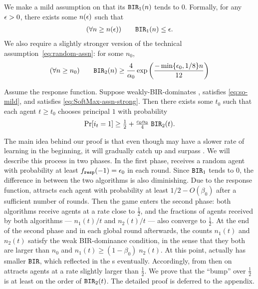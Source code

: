  We make a mild assumption on \alg[1] that its $\mathtt{BIR}_1(n)$ tends to
 0. Formally, for any $\epsilon > 0$, there exists some $n(\epsilon)$ such
 that
 \begin{align}\label{eq:so-mild}
   (\forall n\geq n(\epsilon)) \qquad \mathtt{BIR}_1(n) \leq \epsilon.
 \end{align}
 We also require a slightly stronger version of the technical
 assumption~\eqref{eq:random-assn}:%
for some $n_0$,
\begin{align}\label{eq:SoftMax-assn-strong}
(\forall n\geq n_0) \qquad 
\mathtt{BIR}_2(n) \geq \frac{4}{\alpha_0} \exp \left( \frac{-\min\{\epsilon_0, 1/8\} n}{12}\right)
\end{align}




\begin{theorem}\label{thm:SoftMax-strong}
  Assume the \SoftMaxRandom response function. Suppose \alg[1]
  weakly-BIR-dominates \alg[2], \alg[1] satisfies \eqref{eq:so-mild},
  and \alg[2] satisfies \eqref{eq:SoftMax-assn-strong}. Then there
  exists some $t_0$ such that each agent $t\geq t_0$ chooses principal
  $1$ with probability
\begin{align}\label{eq:thm:SoftMax-strong}
     \Pr[i_t = 1]\geq \tfrac12 +  \tfrac{c_0\alpha_0}{4}\; \mathtt{BIR}_2(t).
\end{align}
\end{theorem}




The main idea behind our proof is that even though \alg[1] may have a slower rate of learning in the beginning, it will gradually catch up
and surpass \alg[2]. We will describe this process in two phases. In
the first phase, \alg[1] receives a random agent with probability at
least $f_{\mathtt{resp}}(-1) = \epsilon_0$ in each round. Since $\mathtt{BIR}_1$ tends to 0,
the difference in  between the two algorithms is also
diminishing. Due to the \SoftMaxRandom response function, \alg[1]
attracts each agent with probability at least $1/2 - O(\beta_0)$ after
a sufficient number of rounds. Then the game enters the second phase:
both algorithms receive agents at a rate close to $\tfrac12$, and the
fractions of agents received by both algorithms --- $n_1(t)/t$ and
$n_2(t)/t$ --- also converge to $\tfrac12$. At the end of the second
phase and in each global round afterwards, the counts $n_1(t)$ and
$n_2(t)$ satisfy the weak BIR-dominance condition, in the sense that
they both are larger than $n_0$ and $n_1(t)\geq (1-\beta_0)\; n_2(t)$.
At this point, \alg[1] actually has smaller $\mathtt{BIR}$, which reflected in the {\PMR}s eventually. Accordingly, from then on \alg[1]
attracts agents at a rate slightly larger than $\tfrac12$. We prove
that the ``bump'' over $\tfrac12$ is at least on the order of
$\mathtt{BIR}_2(t)$. The detailed proof is deferred to the appendix.

